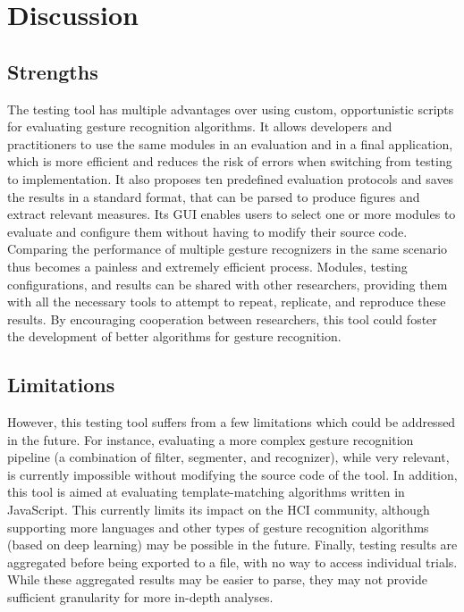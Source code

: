 \section{Discussion} \label{sec:quantumleap-testing:discussion}
\subsection{Strengths} \label{sec:quantumleap-testing:discussion:strengths}
The \ql testing tool has multiple advantages over using custom, opportunistic scripts for evaluating gesture recognition algorithms.
%
It allows developers and practitioners to use the same modules in an evaluation and in a final application, which is more efficient and reduces the risk of errors when switching from testing to implementation.
%
It also proposes ten predefined evaluation protocols and saves the results in a standard format, that can be parsed to produce figures and extract relevant measures.
%
Its GUI enables users to select one or more modules to evaluate and configure them without having to modify their source code. Comparing the performance of multiple gesture recognizers in the same scenario thus becomes a painless and extremely efficient process.
%
Modules, testing configurations, and results can be shared with other researchers, providing them with all the necessary tools to attempt to repeat, replicate, and reproduce these results. By encouraging cooperation between researchers, this tool could foster the development of better algorithms for gesture recognition.

\subsection{Limitations} \label{sec:quantumleap-testing:discussion:limitations}
However, this testing tool suffers from a few limitations which could be addressed in the future.
%
For instance, evaluating a more complex gesture recognition pipeline (\eg a combination of filter, segmenter, and recognizer), while very relevant, is currently impossible without modifying the source code of the tool.
%
In addition, this tool is aimed at evaluating template-matching algorithms written in JavaScript. This currently limits its impact on the HCI community, although supporting more languages and other types of gesture recognition algorithms (\eg based on deep learning) may be possible in the future.
%
Finally, testing results are aggregated before being exported to a file, with no way to access individual trials. While these aggregated results may be easier to parse, they may not provide sufficient granularity for more in-depth analyses.

